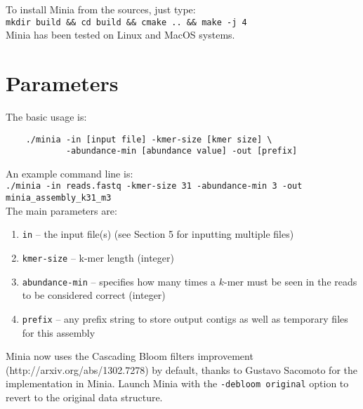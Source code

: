 \documentclass[a4paper]{article}
\begin{document}
To install Minia from the sources, just type: \\ \verb+mkdir build && cd build && cmake .. && make -j 4+ \\
Minia has been tested on Linux and MacOS systems.

\section{Parameters}

The basic usage is:\\

\begin{verbatim}
    ./minia -in [input file] -kmer-size [kmer size] \
            -abundance-min [abundance value] -out [prefix]
\end{verbatim}


An example command line is:\\


\verb+./minia -in reads.fastq -kmer-size 31 -abundance-min 3 -out minia_assembly_k31_m3+\\

The main parameters are:

\begin{enumerate}

    \item \verb+in+ -- the input file(s) (see Section 5 for inputting multiple files)

    \item \verb+kmer-size+  -- k-mer length (integer)

    \item \verb+abundance-min+ -- specifies how many times a $k$-mer must be seen in the reads to be considered correct (integer)

\item \verb+prefix+ -- any prefix string to store output contigs as well as temporary files for this assembly

\end{enumerate}

Minia now uses the Cascading Bloom filters improvement (http://arxiv.org/abs/1302.7278) by default, thanks to Gustavo Sacomoto for the implementation in Minia. Launch Minia with the \verb!-debloom original! option to revert to the original data structure.
\end{document}
